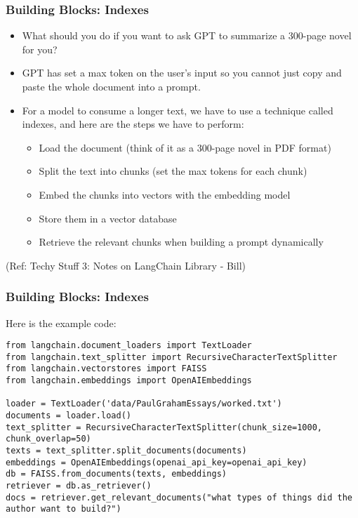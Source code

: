 \begin{frame}[fragile]\frametitle{Building Blocks: Indexes}

\begin{itemize}
\item What should you do if you want to ask GPT to summarize a 300-page novel for you? 
\item GPT has set a max token on the user’s input so you cannot just copy and paste the whole document into a prompt. 
\item For a model to consume a longer text, we have to use a technique called indexes, and here are the steps we have to perform:
\begin{itemize}
\item Load the document (think of it as a 300-page novel in PDF format)
\item Split the text into chunks (set the max tokens for each chunk)
\item Embed the chunks into vectors with the embedding model
\item Store them in a vector database
\item Retrieve the relevant chunks when building a prompt dynamically
\end{itemize}
\end{itemize}

{\tiny (Ref: Techy Stuff 3: Notes on LangChain Library - Bill)}

\end{frame}

\begin{frame}[fragile]\frametitle{Building Blocks: Indexes}

Here is the example code:


\begin{lstlisting}
from langchain.document_loaders import TextLoader
from langchain.text_splitter import RecursiveCharacterTextSplitter
from langchain.vectorstores import FAISS
from langchain.embeddings import OpenAIEmbeddings

loader = TextLoader('data/PaulGrahamEssays/worked.txt')
documents = loader.load()
text_splitter = RecursiveCharacterTextSplitter(chunk_size=1000, chunk_overlap=50)
texts = text_splitter.split_documents(documents)
embeddings = OpenAIEmbeddings(openai_api_key=openai_api_key)
db = FAISS.from_documents(texts, embeddings)
retriever = db.as_retriever()
docs = retriever.get_relevant_documents("what types of things did the author want to build?")
\end{lstlisting}	  
\end{frame}


